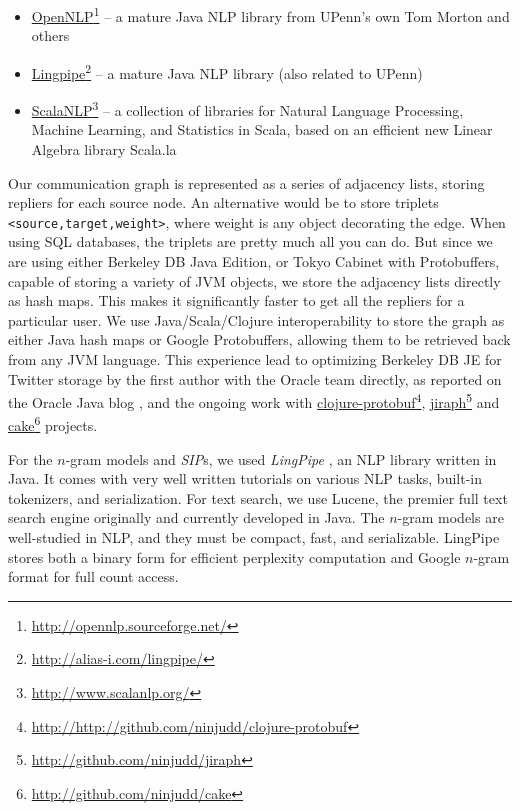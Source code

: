 \documentclass[10pt,oneside]{memoir}
\begin{document}
\begin{Spacing}{2}
\begin{itemize}
\item \href{http://opennlp.sourceforge.net/}{OpenNLP}\footnote{\href{http://opennlp.sourceforge.net/}{http://opennlp.sourceforge.net/}} -- a mature Java NLP library from UPenn's own Tom Morton and others

\item \href{http://alias-i.com/lingpipe/}{Lingpipe}\footnote{\href{http://alias-i.com/lingpipe/}{http://alias-i.com/lingpipe/}} -- a mature Java NLP library (also related to UPenn)

\item \href{http://www.scalanlp.org/}{ScalaNLP}\footnote{\href{http://www.scalanlp.org/}{http://www.scalanlp.org/}}  -- a collection of libraries for Natural Language Processing, Machine Learning, and Statistics in Scala, based on an efficient new Linear Algebra library Scala.la
\end{itemize}

Our communication graph is represented as a series of adjacency lists, storing repliers for each source node. An alternative would be to store triplets \texttt{<source,target,weight>}, where weight is any object decorating the edge. When using SQL databases, the triplets are pretty much all you can do. But since we are using either Berkeley DB Java Edition, or Tokyo Cabinet with Protobuffers, capable of storing a variety of JVM objects, we store the adjacency lists directly as hash maps. This makes it significantly faster to get all the repliers for a particular user. We use Java/Scala/Clojure interoperability to store the graph as either Java hash maps or Google Protobuffers, allowing them to be retrieved back from any JVM language. This experience lead to optimizing Berkeley DB JE for Twitter storage by the first author with the Oracle team directly, as reported on the Oracle Java blog \cite{OracleBlog:Khrabrov}, and the ongoing work with \href{http://http://github.com/ninjudd/clojure-protobuf}{clojure-protobuf}\footnote{\href{http://http://github.com/ninjudd/clojure-protobuf}{http://http://github.com/ninjudd/clojure-protobuf}}, \href{http://github.com/ninjudd/jiraph}{jiraph}\footnote{\href{http://github.com/ninjudd/jiraph}{http://github.com/ninjudd/jiraph}} and \href{http://github.com/ninjudd/cake}{cake}\footnote{\href{http://github.com/ninjudd/cake}{http://github.com/ninjudd/cake}} projects.


For the $n$-gram models and {\itshape SIP}s, we used {\itshape LingPipe} \cite{code:lingpipe}, an NLP library written in Java. It comes with very well written tutorials on various NLP tasks, built-in tokenizers, and serialization. For text search, we use Lucene, the premier full text search engine originally and currently developed in Java. The $n$-gram models are well-studied in NLP, and they must be compact, fast, and serializable. LingPipe stores both a binary form for efficient perplexity computation and Google $n$-gram format for full count access.



\end{Spacing}
\end{document}
